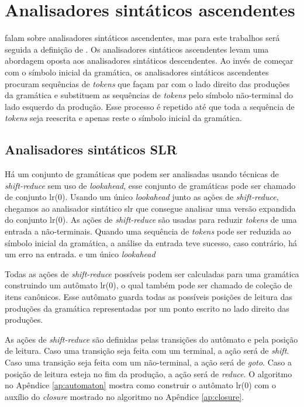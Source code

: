 \section{Analisadores sintáticos ascendentes}
\label{sec:parser-bu}
\textcite{cooper2022engineering,mogensen2024introduction, thain2020introduction} falam sobre analisadores sintáticos ascendentes, mas para este trabalhos será seguida a definição de \textcite{thain2020introduction}. Os analisadores sintáticos ascendentes levam uma abordagem oposta aos analisadores sintáticos descendentes. Ao invés de começar com o símbolo inicial da gramática, os analisadores sintáticos ascendentes procuram sequências de \textit{tokens} que façam par com o lado direito das produções da gramática e substituem as sequências de \textit{tokens} pelo símbolo não-terminal do lado esquerdo da produção. Esse processo é repetido até que toda a sequência de \textit{tokens} seja reescrita e apenas reste o símbolo inicial da gramática.


\subsection{Analisadores sintáticos SLR}
Há um conjunto de gramáticas que podem ser analisadas usando técnicas de \textit{shift-reduce} sem uso de \textit{lookahead}, esse conjunto de gramáticas pode ser chamado de conjunto \gls{lr}(0). Usando um único \textit{lookahead} junto as ações de \textit{shift-reduce}, chegamos ao analisador sintático \gls{slr} que consegue analisar uma versão expandida do conjunto \gls{lr}(0). As ações de \textit{shift-reduce} são usadas para reduzir \textit{tokens} de uma entrada a não-terminais. Quando uma sequência de \textit{tokens} pode ser reduzida ao símbolo inicial da gramática, a análise da entrada teve sucesso, caso contrário, há um erro na entrada.
e um único \textit{lookahead}

Todas as ações de \textit{shift-reduce} possíveis podem ser calculadas para uma gramática construindo um autômato \gls{lr}(0), o qual também pode ser chamado de coleção de itens canônicos. Esse autômato guarda todas as possíveis posições de leitura das produções da gramática representadas por um ponto escrito no lado direito das produções.

As ações de \textit{shift-reduce} são definidas pelas transições do autômato e pela posição de leitura. Caso uma transição seja feita com um terminal, a ação será de \textit{shift}. Caso uma transição seja feita com um não-terminal, a ação será de \textit{goto}. Caso a posição de leitura esteja no fim da produção, a ação será de \textit{reduce}. O algoritmo no Apêndice \ref{ap:automaton} mostra como construir o autômato \gls{lr}(0) com o auxílio do \textit{closure} mostrado no algoritmo no Apêndice \ref{ap:closure}.

